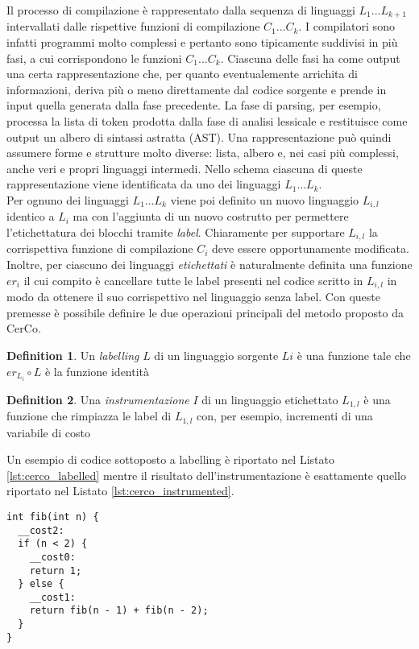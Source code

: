 \documentclass[12pt,a4paper,openright,oneside]{report}
\theoremstyle{definition}
\newtheorem{definition}{Definition}
\begin{document}
Il processo di compilazione \`{e} rappresentato dalla sequenza di linguaggi $L_1...L_{k+1}$ intervallati dalle rispettive funzioni di compilazione $C_1...C_k$. I compilatori sono infatti programmi molto complessi e pertanto sono tipicamente suddivisi in pi\`{u} fasi, a cui corrispondono le funzioni $C_1...C_k$. Ciascuna delle fasi ha come output una certa rappresentazione che, per quanto eventualemente arrichita di informazioni, deriva pi\`{u} o meno direttamente dal codice sorgente e prende in input quella generata dalla fase precedente. La fase di parsing, per esempio, processa la lista di token prodotta dalla fase di analisi lessicale e restituisce come output un albero di sintassi astratta (AST). Una rappresentazione pu\`{o} quindi assumere forme e strutture molto diverse: lista, albero e, nei casi pi\`{u} complessi, anche veri e propri linguaggi intermedi. Nello schema ciascuna di queste rappresentazione viene identificata da uno dei linguaggi $L_1...L_k$.\\
Per ognuno dei linguaggi $L_1...L_k$ viene poi definito un nuovo linguaggio $L_{i,l}$ identico a $L_i$ ma con l'aggiunta di un nuovo costrutto per permettere l'etichettatura dei blocchi tramite \textit{label}. Chiaramente per supportare $L_{i,l}$ la corrispettiva funzione di compilazione $C_i$ deve essere opportunamente modificata. Inoltre, per ciascuno dei linguaggi \textit{etichettati} \`{e} naturalmente definita una funzione $er_i$ il cui compito \`{e} cancellare tutte le label presenti nel codice scritto in $L_{i,l}$ in modo da ottenere il suo corrispettivo nel linguaggio senza label.
Con queste premesse \`{e} possibile definire le due operazioni principali del metodo proposto da CerCo.
\begin{definition}\label{def:labelling}
Un \textit{labelling} $L$ di un linguaggio sorgente $Li$ \`{e} una funzione tale che $er_{L_i}{\circ}L$ \`{e} la funzione identit\`{a}
\end{definition}
\begin{definition}\label{def:instrumentation}
Una \textit{instrumentazione} $I$ di un linguaggio etichettato $L_{1,l}$ \`{e} una funzione che rimpiazza le label di $L_{1,l}$ con, per esempio, incrementi di una variabile di costo
\end{definition}
Un esempio di codice sottoposto a labelling \`{e} riportato nel Listato \ref{lst:cerco_labelled} mentre il risultato dell'instrumentazione \`{e} esattamente quello riportato nel Listato \ref{lst:cerco_instrumented}.
\begin{lstlisting}[caption=Sorgente etichettato da CerCo,label={lst:cerco_labelled},frame=tlrb]
int fib(int n) {
  __cost2:
  if (n < 2) {
    __cost0:
    return 1;
  } else {
    __cost1:
    return fib(n - 1) + fib(n - 2);
  }
}
\end{lstlisting}
\end{document}
